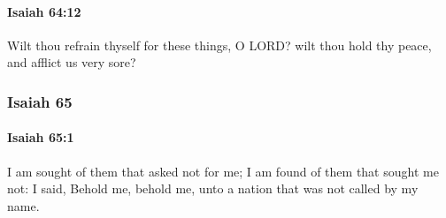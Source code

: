 		\paragraph{Isaiah 64:12} %
			\label{ISAIAH-64-12}

			Wilt thou refrain thyself for these things, O LORD? wilt thou hold thy peace, and afflict us very sore?

	\subsubsection{Isaiah 65} %
		\label{ISAIAH-65}

		\paragraph{Isaiah 65:1} %
			\label{ISAIAH-65-1}

			I am sought of them that asked not for me; I am found of them that sought me not: I said, Behold me, behold me, unto a nation that was not called by my name.

